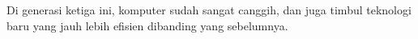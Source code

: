 Di generasi ketiga ini, komputer sudah sangat canggih, dan juga timbul teknologi baru
yang jauh lebih efisien dibanding yang sebelumnya.
